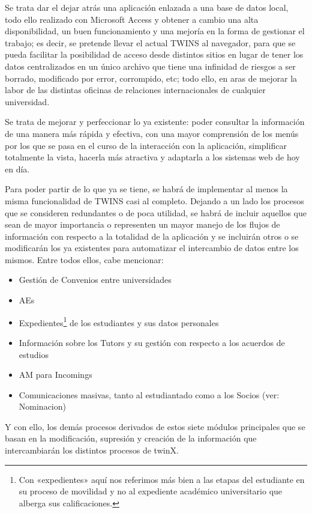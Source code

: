 Se trata dar el dejar atrás una aplicación enlazada a una base de datos local, todo ello realizado con Microsoft Access y obtener a cambio una alta disponibilidad, un buen funcionamiento y una mejoría en la forma de gestionar el trabajo; es decir, se pretende llevar el actual TWINS al navegador, para que se pueda facilitar la posibilidad de acceso desde distintos sitios en lugar de tener los datos centralizados en un único archivo que tiene una infinidad de riesgos a ser borrado, modificado por error, corrompido, etc; todo ello, en aras de mejorar la labor de las distintas oficinas de relaciones internacionales de cualquier universidad.

Se trata de mejorar y perfeccionar lo ya existente: poder consultar la información de una manera más rápida y efectiva, con una mayor comprensión de los menús por los que se pasa en el curso de la interacción con la aplicación, simplificar totalmente la vista, hacerla más atractiva y adaptarla a los sistemas web de hoy en día.

Para poder partir de lo que ya se tiene, se habrá de implementar al menos la misma funcionalidad de TWINS casi al completo. Dejando a un lado los procesos que se consideren redundantes o de poca utilidad, se habrá de incluir aquellos que sean de mayor importancia o representen un mayor manejo de los flujos de información con respecto a la totalidad de la aplicación y se incluirán otros o se modificarán los ya existentes para automatizar el intercambio de datos entre los mismos. Entre todos ellos, cabe mencionar:

\begin{itemize}
	\item Gestión de \glspl{Convenio} entre universidades
	\item \glspl{AE}
	\item Expedientes\footnote{Con «expedientes» aquí nos referimos más bien a las etapas del estudiante en su proceso de movilidad y no al expediente académico universitario que alberga sus calificaciones.} de los estudiantes y sus datos personales
	\item Información sobre los \glspl{Tutor} y su gestión con respecto a los acuerdos de estudios
	\item \gls{AM} para \glspl{Incoming}
	\item Comunicaciones masivas, tanto al estudiantado como a los \glspl{Socio} (ver: \gls{Nominacion})
\end{itemize}

Y con ello, los demás procesos derivados de estos siete módulos principales que se basan en la modificación, supresión y creación de la información que intercambiarán los distintos procesos de twinX.

